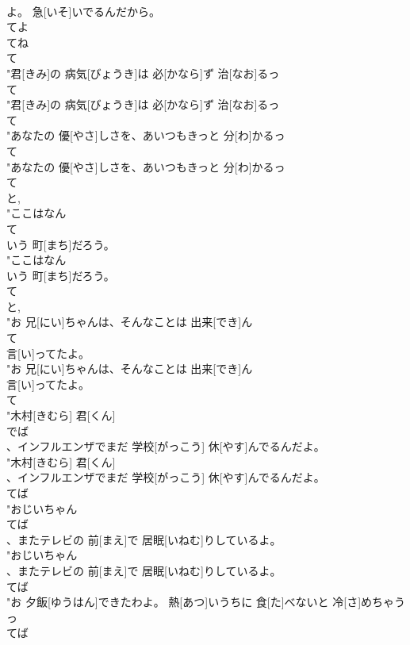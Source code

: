 \documentclass[8pt]{extreport}
\begin{document}
\begin{CJK}{UTF8}{min}
\\	よ。 急[いそ]いでるんだから。
\\	てよ 
\\	てね 
\\	て
\\	"君[きみ]の 病気[びょうき]は 必[かなら]ず 治[なお]るっ
\\	て
\\	"君[きみ]の 病気[びょうき]は 必[かなら]ず 治[なお]るっ
\\	て
\\	"あなたの 優[やさ]しさを、あいつもきっと 分[わ]かるっ
\\	て
\\	"あなたの 優[やさ]しさを、あいつもきっと 分[わ]かるっ
\\	て
\\	と, 
\\	"ここはなん
\\	て
\\	いう 町[まち]だろう。
\\	"ここはなん
\\	いう 町[まち]だろう。
\\	て
\\	と, 
\\	"お 兄[にい]ちゃんは、そんなことは 出来[でき]ん
\\	て
\\	言[い]ってたよ。
\\	"お 兄[にい]ちゃんは、そんなことは 出来[でき]ん
\\	言[い]ってたよ。
\\	て
\\	"木村[きむら] 君[くん]
\\	でば
\\	、インフルエンザでまだ 学校[がっこう] 休[やす]んでるんだよ。
\\	"木村[きむら] 君[くん]
\\	、インフルエンザでまだ 学校[がっこう] 休[やす]んでるんだよ。
\\	てば
\\	"おじいちゃん
\\	てば
\\	、またテレビの 前[まえ]で 居眠[いねむ]りしているよ。
\\	"おじいちゃん
\\	、またテレビの 前[まえ]で 居眠[いねむ]りしているよ。
\\	てば
\\	"お 夕飯[ゆうはん]できたわよ。 熱[あつ]いうちに 食[た]べないと 冷[さ]めちゃうっ
\\	てば

\end{CJK}
\end{document}
